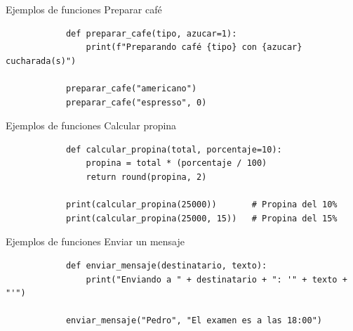 \documentclass{beamer}
\begin{document}
    \begin{frame}[fragile, t]{Ejemplos de funciones}
        Preparar café
        \begin{verbatim}
            def preparar_cafe(tipo, azucar=1):
                print(f"Preparando café {tipo} con {azucar} cucharada(s)")
            
            preparar_cafe("americano")
            preparar_cafe("espresso", 0)
        \end{verbatim}
    \end{frame}

    \begin{frame}[fragile, t]{Ejemplos de funciones}
        Calcular propina
        \begin{verbatim}
            def calcular_propina(total, porcentaje=10):
                propina = total * (porcentaje / 100)
                return round(propina, 2)
            
            print(calcular_propina(25000))       # Propina del 10%
            print(calcular_propina(25000, 15))   # Propina del 15%
        \end{verbatim}
    \end{frame}

    \begin{frame}[fragile, t]{Ejemplos de funciones}
        Enviar un mensaje
        \begin{verbatim}
            def enviar_mensaje(destinatario, texto):
                print("Enviando a " + destinatario + ": '" + texto + "'")
            
            enviar_mensaje("Pedro", "El examen es a las 18:00")
        \end{verbatim}
    \end{frame}

            
\end{document}
